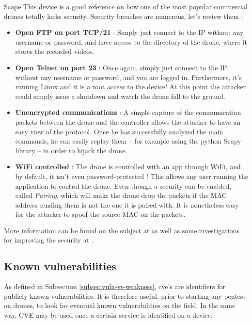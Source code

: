 \begin{chaptercover}{Scope}
This device is a good reference on how one of the most popular commercial drones totally lacks security. Security breaches are numerous, let’s review them :
\begin{itemize}
  \item \textbf{Open FTP on port TCP/21} : Simply just connect to the IP without any username or password, and have access to the directory of the drone, where it stores the recorded videos.
  \item \textbf{Open Telnet on port 23} : Once again, simply just connect to the IP without any username or password, and you are logged in. Furthermore, it's running Linux and it is a root access to the device! At this point the attacker could simply issue a shutdown and watch the drone fall to the ground.
  \item \textbf{Unencrypted communications} : A simple capture of the communication packets between the drone and the controller allows the attacker to have an easy view of the protocol. Once he has successfully analyzed the main commands, he can easily replay them -- for example using the python Scapy library -- in order to hijack the drone.
  \item \textbf{WiFi controlled} : The drone is controlled with an app through WiFi, and by default, it isn’t even password-protected ! This allows any user running the application to control the drone. Even though a security can be enabled, called \textit{Pairing}, which will make the drone drop the packets if the MAC address sending them is not the one it is paired with. It is nonetheless easy for the attacker to spoof the source MAC on the packets.
\end{itemize}

More information can be found on the subject at \cite{github-drone-hacking} as well as some investigations for improving the security at \cite{hacking-securing-ardrone2}.

\subsection{Known vulnerabilities}

As defined in Subsection \ref{subsec:vuln-vs-weakness}, \acrshort{cve}'s are identifiers for publicly known vulnerabilities. It is therefore useful, prior to starting any pentest on drones, to look for eventual known vulnerabilities on the field. In the same way, CVE may be used once a certain service is identified on a device.


\end{chaptercover}
